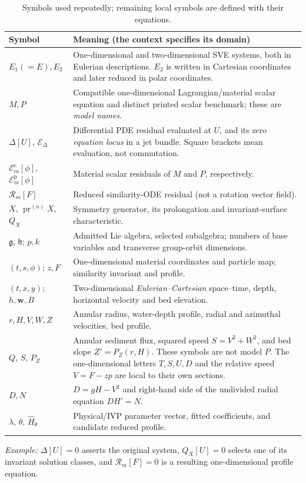 \documentclass[12pt,a4paper,oneside]{report}
\numberwithin{equation}{chapter}
\theoremstyle{remark}\newtheorem{remark}[theorem]{Remark}
\begin{document}
\begin{table}[h!]\centering\small
\begin{tabularx}{\textwidth}{@{}p{}X@{}}\toprule
Symbol & Meaning (the context specifies its domain)\\\midrule
$E_1(=E),E_2$ & One-dimensional and two-dimensional SVE systems, both in Eulerian descriptions. $E_2$ is written in Cartesian coordinates and later reduced in polar coordinates.\\
$M,P$ & Compatible one-dimensional Lagrangian/material scalar equation and distinct printed scalar benchmark; these are \emph{model names}.\\
$\Delta[U]$, $\mathscr E_\Delta$ & Differential PDE residual evaluated at $U$, and its zero \emph{equation locus} in a jet bundle. Square brackets mean evaluation, not commutation.\\
$\mathcal E_m^{\mathrm c}[\phi]$, $\mathcal E_m^{\mathrm p}[\phi]$ & Material scalar residuals of $M$ and $P$, respectively.\\
$\mathcal R_m[F]$ & Reduced similarity-ODE residual (not a rotation vector field).\\
$X$, $\operatorname{pr}^{(n)}X$, $Q_X$ & Symmetry generator, its prolongation and invariant-surface characteristic.\\
$\mathfrak g$, $\mathfrak h$; $p,k$ & Admitted Lie algebra, selected subalgebra; numbers of base variables and transverse group-orbit dimensions.\\
$(t,s,\phi)$; $z,F$ & One-dimensional material coordinates and particle map; similarity invariant and profile.\\
$(t,x,y)$; $h,\mathbf w,B$ & Two-dimensional \emph{Eulerian--Cartesian} space--time, depth, horizontal velocity and bed elevation.\\
$r,H,V,W,Z$ & Annular radius, water-depth profile, radial and azimuthal velocities, bed profile.\\
$Q$, $S$, $P_Z$ & Annular sediment flux, squared speed $S=V^2+W^2$, and bed slope $Z'=P_Z(r,H)$. These symbols are not model $P$. The one-dimensional letters $T,S,U,D$ and the relative speed $V=F-zp$ are local to their own sections.\\
$D,N$ & $D=gH-V^2$ and right-hand side of the undivided radial equation $DH'=N$.\\
$\lambda$, $\theta$, $\widehat H_\theta$ & Physical/IVP parameter vector, fitted coefficients, and candidate reduced profile.\\\bottomrule
\end{tabularx}
\caption[Symbols and notation]{Symbols used repeatedly; remaining local symbols are defined with their equations.}
\end{table}
\noindent\emph{Example:} $\Delta[U]=0$ asserts the original system,
$Q_X[U]=0$ selects one of its invariant solution classes, and
$\mathcal R_m[F]=0$ is a resulting one-dimensional profile equation.
\end{document}
